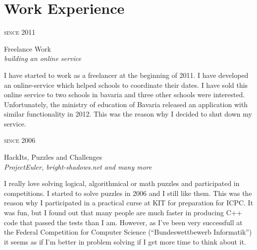 \documentclass[a4paper,10pt]{article} %
\begin{document}
{\begin{minipage}[t]{0.5\textwidth}

\section{Work Experience}

{\raggedleft\textsc{since 2011}\par}

{\raggedright\large Freelance Work\\
\textit{building an online service}\\[5pt]}

\normalsize{I have started to work as a freelancer at the beginning
of 2011. I have developed an online-service which helped
schools to coordinate their dates. I have sold this online service to
two schools in bavaria and three other schools were interested.
Unfortunately, the ministry of education of Bavaria
released an application with similar functionality in
2012. This was the reason why I decided to shut down my service.}\\

{\raggedleft\textsc{since 2006}\par}

{\raggedright\large HackIts, Puzzles and Challenges\\
\textit{ProjectEuler, bright-shadows.net and many more}\\[5pt]}

\normalsize{I really love solving logical, algorithmical or math
puzzles and participated in competitions. I started to solve puzzles
in 2006 and I still like them. This was the reason why I participated
in a practical curse at KIT for preparation for ICPC. It was fun,
but I found out that many people are much faster in producing C++
code that passed the tests than I am.
However, as I've been very successfull at the Federal Competition for
Computer Science (``Bundeswettbewerb Informatik'') it seems as if I'm
better in problem solving if I get more time to think about it.}\\



\end{minipage}}
\end{document}
